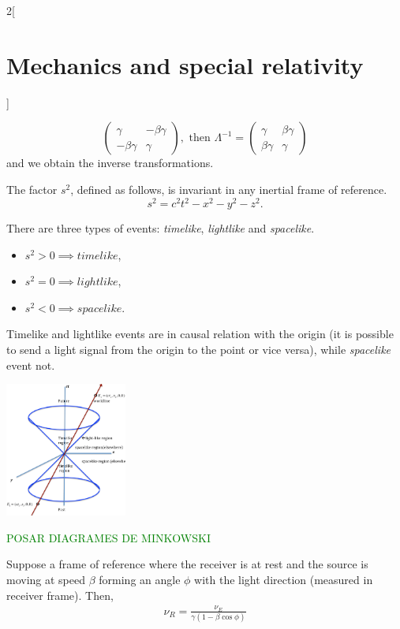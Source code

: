 \documentclass[class=article,10pt,crop=false]{standalone}
\begin{document}
\begin{multicols}{2}[\section{Mechanics and special relativity}]
\begin{concept}
$$\begin{pmatrix}
\gamma & -\beta\gamma\\
-\beta\gamma & \gamma
\end{pmatrix},\text{ then }\Lambda^{-1}=\begin{pmatrix}
\gamma & \beta\gamma\\
\beta\gamma & \gamma
\end{pmatrix}$$ and we obtain the inverse transformations.
\end{concept}
\begin{concept}
The factor $s^2$, defined as follows, is invariant in any inertial frame of reference. $$s^2=c^2t^2-x^2-y^2-z^2.$$
\end{concept}
\begin{concept}
There are three types of events: \textit{timelike}, \textit{lightlike} and \textit{spacelike}.
\begin{itemize}
    \item $s^2>0\implies timelike$,
    \item $s^2=0\implies lightlike$,
    \item $s^2<0\implies spacelike$.
\end{itemize}
Timelike and lightlike events are in causal relation with the origin (it is possible to send a light signal from the origin to the point or vice versa), while \textit{spacelike} event not.
\end{concept}
\begin{minipage}{\linewidth}
    \centering
    \includegraphics[width=4cm]{Physics/1st/Mechanics_and_special_relativity/Images/mink.png}
\end{minipage}
\textcolor{green}{POSAR DIAGRAMES DE MINKOWSKI}
\begin{concept}
Suppose a frame of reference where the receiver is at rest and the source is moving at speed $\beta$ forming an angle $\phi$ with the light direction (measured in receiver frame). Then, 
\begin{gather}
    \label{dopp1}\nu_R=\frac{\nu_E}{\gamma(1-\beta\cos\phi)}\\

\end{gather}
\end{concept}
\end{multicols}
\end{document}
